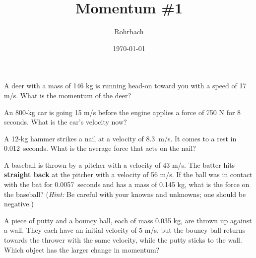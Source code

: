 \documentclass[10pt]{exam}
\title{Momentum \#1}
\author{Rohrbach}
\date{\today}
\begin{document}
\maketitle

\begin{questions}
  
  \question
    A deer with a mass of 146 kg is running head-on toward you with a speed of 17 m/s. What is the momentum of the deer?
    \vs
  
  \question
    An 800-kg car is going 15 m/s before the engine applies a force of 750 N for 8 seconds.  What is the car's velocity now?
    \vs[2]

  \question
    A 12-kg hammer strikes a nail at a velocity of 8.3~m/s.  It comes to a rest in 0.012~seconds.  What is the average force that acts on the nail?
    \vs[2]

  \pagebreak

  \question
    A baseball is thrown by a pitcher with a velocity of 43 m/s. The batter hits {\bf straight back} at the pitcher with a velocity of 56 m/s. If the ball was in contact with the bat for 0.0057~seconds and has a mass of 0.145 kg, what is the force on the baseball? (\emph{Hint:} Be careful with your knowns and unknowns; one should be negative.)
    \vs
  
  \question
    A piece of putty and a bouncy ball, each of mass 0.035 kg, are thrown up against a wall. They each have an initial velocity of 5 m/s, but the bouncy ball returns towards the thrower with the same velocity, while the putty sticks to the wall. Which object has the larger change in momentum?

    \begin{center}
\end{center}
\end{questions}
\end{document}
